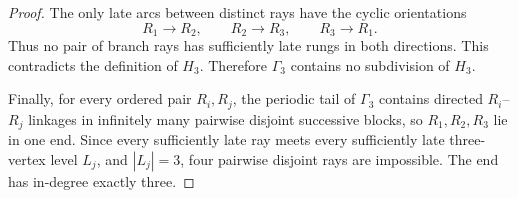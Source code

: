 \documentclass[10pt,a4paper]{amsart}
\begin{document}
\begin{proof}
The only late arcs between distinct rays have the cyclic orientations
\[
R_1\to R_2,
\qquad R_2\to R_3,
\qquad R_3\to R_1.
\]
Thus no pair of branch rays has sufficiently late rungs in both directions. This contradicts the definition of $H_3$. Therefore $\Gamma_3$ contains no subdivision of $H_3$.

Finally, for every ordered pair $R_i,R_j$, the periodic tail of $\Gamma_3$ contains directed $R_i$--$R_j$ linkages in infinitely many pairwise disjoint successive blocks, so $R_1,R_2,R_3$ lie in one end. Since every sufficiently late ray meets every sufficiently late three-vertex level $L_j$, and $|L_j|=3$, four pairwise disjoint rays are impossible. The end has in-degree exactly three.
\end{proof}
\end{document}
